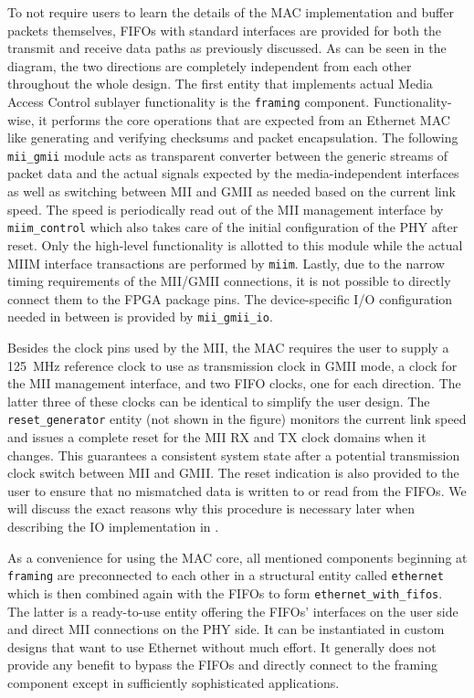 \documentclass[a4paper, 11pt, oneside]{Thesis}  %
\begin{document}
To not require users to learn the details of the MAC implementation and buffer packets themselves, FIFOs with standard interfaces are provided for both the transmit and receive data paths as previously discussed. As can be seen in the diagram, the two directions are completely independent from each other throughout the whole design. The first entity that implements actual Media Access Control sublayer functionality is the \texttt{framing} component. Functionality-wise, it performs the core operations that are expected from an Ethernet MAC like generating and verifying checksums and packet encapsulation. The following \texttt{mii\_gmii} module acts as transparent converter between the generic streams of packet data and the actual signals expected by the media-independent interfaces as well as switching between MII and GMII as needed based on the current link speed. The speed is periodically read out of the MII management interface by \texttt{miim\_control} which also takes care of the initial configuration of the PHY after reset. Only the high-level functionality is allotted to this module while the actual MIIM interface transactions are performed by \texttt{miim}. Lastly, due to the narrow timing requirements of the MII/GMII connections, it is not possible to directly connect them to the FPGA package pins. The device-specific I/O configuration needed in between is provided by \texttt{mii\_gmii\_io}.

Besides the clock pins used by the MII, the MAC requires the user to supply a 125~MHz reference clock to use as transmission clock in GMII mode, a clock for the MII management interface, and two FIFO clocks, one for each direction. The latter three of these clocks can be identical to simplify the user design.
\clearpage
The \texttt{reset\_generator} entity (not shown in the figure) monitors the current link speed and issues a complete reset for the MII RX and TX clock domains when it changes. This guarantees a consistent system state after a potential transmission clock switch between MII and GMII. The reset indication is also provided to the user to ensure that no mismatched data is written to or read from the FIFOs. We will discuss the exact reasons why this procedure is necessary later when describing the IO implementation in .

As a convenience for using the MAC core, all mentioned components beginning at \texttt{framing} are preconnected to each other in a structural entity called \texttt{ethernet} which is then combined again with the FIFOs to form \texttt{ethernet\_with\_fifos}. The latter is a ready-to-use entity offering the FIFOs' interfaces on the user side and direct MII connections on the PHY side. It can be instantiated in custom designs that want to use Ethernet without much effort. It generally does not provide any benefit to bypass the FIFOs and directly connect to the framing component except in sufficiently sophisticated applications.
\end{document}
